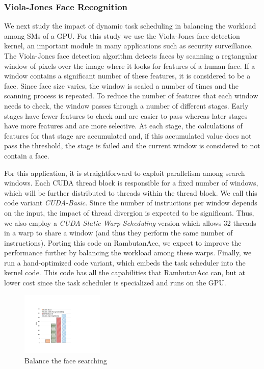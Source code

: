 \subsubsection{Viola-Jones Face Recognition}
We next study the impact of dynamic task scheduling in balancing the workload among SMs of a GPU.
For this study we use the Viola-Jones face detection kernel, an important module in many applications such as security surveillance.
The Viola-Jones face detection algorithm detects faces by scanning a regtangular window of pixels over the image where it looks for features of a human face. 
If a window contains a significant number of these features, it is considered to be a face. 
Since face size varies, the window is scaled a number of times and the scanning process is repeated. 
To reduce the number of features that each window needs to check, the window passes through a number of different stages. 
Early stages have fewer features to check and are easier to pass whereas later stages have more features and are more selective. 
At each stage, the calculations of features for that stage are accumulated and, if this accumulated value does not pass the threshold, the stage is failed and the current window is considered to not contain a face. 

For this application, it is straightforward to exploit parallelism among search windows.
Each CUDA thread block is responsible for a fixed number of windows, which will be further distributed to threads within the thread block.
We call this code variant {\em CUDA-Basic}.
Since the number of instructions per window depends on the input, the impact of thread divergion is expected to be significant.
Thus, we also employ a {\em CUDA-Static Warp Scheduling} version which allows 32 threads in a warp to share a window (and thus they perform the same number of instructions).
Porting this code on RambutanAcc, we expect to improve the performance further by balancing the workload among these warps.
Finally, we run a hand-optimized code variant, which embeds the task scheduler into the kernel code.
This code has all the capabilities that RambutanAcc can, but at lower cost since the task scheduler is specialized and runs on the GPU.

\begin{figure}[htb]
\centering
\includegraphics[width=0.35\textwidth]{figures/faceRecognition.pdf}
\caption{Balance the face searching}
\label{faceRecognition}
\end{figure}

